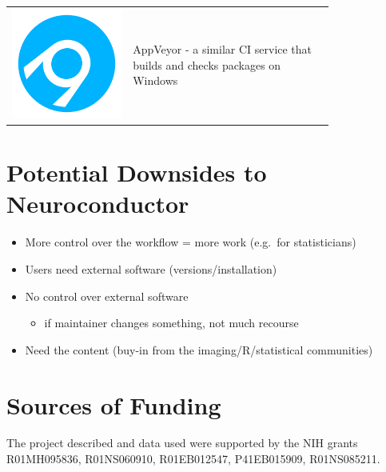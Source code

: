 \documentclass[final]{beamer}\usepackage[]{graphicx}\usepackage[]{color}
\begin{document}
\begin{frame}[fragile]
\begin{table}[!htb]
\begin{minipage}{0.36\linewidth}
\begin{center}
\begin{tabular}{m{0.3\linewidth}m{0.5\linewidth}}
\includegraphics[clip, scale=0.5, keepaspectratio]{figures/appveyor-logo-256.png} & AppVeyor - a similar CI service that builds and checks packages on Windows 
\end{tabular}
\end{center}



\vspace*{-0.8cm}
\section{Potential Downsides to Neuroconductor}
\begin{itemize}
\item More control over the workflow = more work (e.g.~for statisticians)
\item Users need external software (versions/installation)
\item No control over external software
  \begin{itemize}
    \item if maintainer changes something, not much recourse
  \end{itemize}
\item Need the content (buy-in from the imaging/R/statistical communities)
\end{itemize}


\section{Sources of Funding}
{\scriptsize
The project described and data used were supported by the NIH grants
R01MH095836, R01NS060910, R01EB012547, P41EB015909,  R01NS085211.
}



\end{minipage}
\end{table}
\end{frame}
\end{document}
